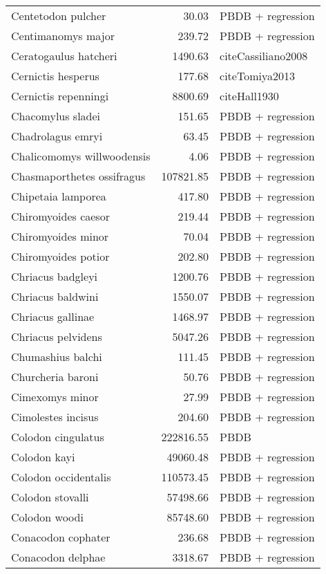 \begin{table}[ht]
\begin{tabular}{lrl}
  Centetodon pulcher & 30.03 & PBDB + regression \\ 
  Centimanomys major & 239.72 & PBDB + regression \\ 
  Ceratogaulus hatcheri & 1490.63 & cite{Cassiliano2008} \\ 
  Cernictis hesperus & 177.68 & cite{Tomiya2013} \\ 
  Cernictis repenningi & 8800.69 & cite{Hall1930} \\ 
  Chacomylus sladei & 151.65 & PBDB + regression \\ 
  Chadrolagus emryi & 63.45 & PBDB + regression \\ 
  Chalicomomys willwoodensis & 4.06 & PBDB + regression \\ 
  Chasmaporthetes ossifragus & 107821.85 & PBDB + regression \\ 
  Chipetaia lamporea & 417.80 & PBDB + regression \\ 
  Chiromyoides caesor & 219.44 & PBDB + regression \\ 
  Chiromyoides minor & 70.04 & PBDB + regression \\ 
  Chiromyoides potior & 202.80 & PBDB + regression \\ 
  Chriacus badgleyi & 1200.76 & PBDB + regression \\ 
  Chriacus baldwini & 1550.07 & PBDB + regression \\ 
  Chriacus gallinae & 1468.97 & PBDB + regression \\ 
  Chriacus pelvidens & 5047.26 & PBDB + regression \\ 
  Chumashius balchi & 111.45 & PBDB + regression \\ 
  Churcheria baroni & 50.76 & PBDB + regression \\ 
  Cimexomys minor & 27.99 & PBDB + regression \\ 
  Cimolestes incisus & 204.60 & PBDB + regression \\ 
  Colodon cingulatus & 222816.55 & PBDB \\ 
  Colodon kayi & 49060.48 & PBDB + regression \\ 
  Colodon occidentalis & 110573.45 & PBDB + regression \\ 
  Colodon stovalli & 57498.66 & PBDB + regression \\ 
  Colodon woodi & 85748.60 & PBDB + regression \\ 
  Conacodon cophater & 236.68 & PBDB + regression \\ 
  Conacodon delphae & 3318.67 & PBDB + regression \\ 

\end{tabular}
\end{table}
